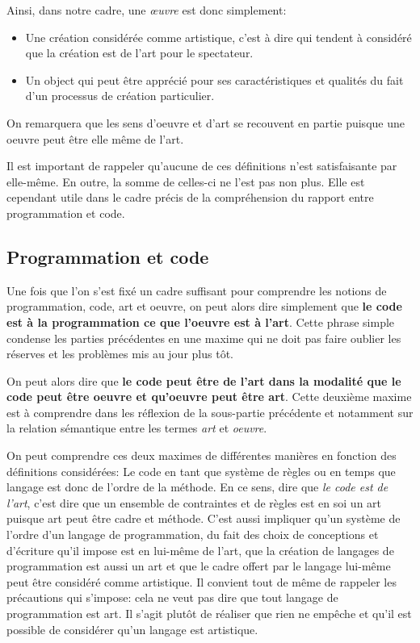\documentclass[12pt]{article} %
\begin{document}
Ainsi, dans notre cadre, une \textit{œuvre} est donc simplement:
\begin{itemize}
    \item Une création considérée comme artistique, c'est à dire qui tendent à considéré que la création est de l'art pour le spectateur.
    \item Un object qui peut être apprécié pour ses caractéristiques et qualités du fait d'un processus de création particulier.
\end{itemize}
On remarquera que les sens d'oeuvre et d'art se recouvent en partie puisque une oeuvre peut être elle même de l'art.

Il est important de rappeler qu'aucune de ces définitions n'est satisfaisante par elle-même. En outre, la somme de celles-ci ne l'est pas non plus. Elle est cependant utile dans le cadre précis de la compréhension du rapport entre programmation et code.

\subsection{Programmation et code} %
Une fois que l'on s'est fixé un cadre suffisant pour comprendre les notions de programmation, code, art et oeuvre, on peut alors dire simplement que \textbf{le code est à la programmation ce que l'oeuvre est à l'art}. Cette phrase simple condense les parties précédentes en une maxime qui ne doit pas faire oublier les réserves et les problèmes mis au jour plus tôt.

On peut alors dire que \textbf{le code peut être de l'art dans la modalité que le code peut être oeuvre et qu'oeuvre peut être art}. Cette deuxième maxime est à comprendre dans les réflexion de la sous-partie précédente et notamment sur la relation sémantique entre les termes \textit{art} et \textit{oeuvre}.

On peut comprendre ces deux maximes de différentes manières en fonction des définitions considérées: Le code en tant que système de règles ou en temps que langage est donc de l'ordre de la méthode. En ce sens, dire que \textit{le code est de l'art}, c'est dire que un ensemble de contraintes et de règles est en soi un art puisque art peut être cadre et méthode. C'est aussi impliquer qu'un système de l'ordre d'un langage de programmation, du fait des choix de conceptions et d'écriture qu'il impose est en lui-même de l'art, que la création de langages de programmation est aussi un art et que le cadre offert par le langage lui-même peut être considéré comme artistique. Il convient tout de même de rappeler les précautions qui s'impose: cela ne veut pas dire que tout langage de programmation est art. Il s'agit plutôt de réaliser que rien ne empêche et qu'il est possible de considérer qu'un langage est artistique.
\end{document}
